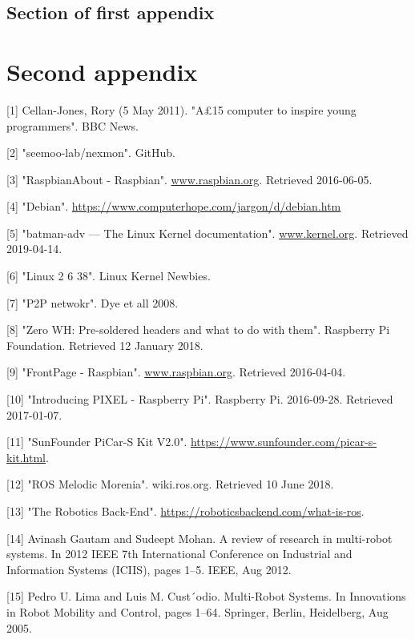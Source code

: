 \documentclass{mproj}
\begin{document}
\section{Section of first appendix}

\chapter{Second appendix}



[1] Cellan-Jones, Rory (5 May 2011). "A£15 computer to inspire young programmers". BBC News.

[2]  "seemoo-lab/nexmon". GitHub.

[3] "RaspbianAbout - Raspbian". \url{www.raspbian.org}. Retrieved 2016-06-05.

[4] "Debian". \url{https://www.computerhope.com/jargon/d/debian.htm}

[5] "batman-adv — The Linux Kernel documentation". \url{www.kernel.org}. Retrieved 2019-04-14.

[6] "Linux 2 6 38". Linux Kernel Newbies.

[7] "P2P netwokr". Dye et all 2008.

[8] "Zero WH: Pre-soldered headers and what to do with them". Raspberry Pi Foundation. Retrieved 12 January 2018.

[9] "FrontPage - Raspbian". \url{www.raspbian.org}. Retrieved 2016-04-04.

[10] "Introducing PIXEL - Raspberry Pi". Raspberry Pi. 2016-09-28. Retrieved 2017-01-07.

[11] "SunFounder PiCar-S Kit V2.0". \url{https://www.sunfounder.com/picar-s-kit.html}.

[12] "ROS Melodic Morenia". wiki.ros.org. Retrieved 10 June 2018.

[13] "The Robotics Back-End". \url{https://roboticsbackend.com/what-is-ros}.

[14] Avinash Gautam and Sudeept Mohan. A review of research in multi-robot systems. In 2012 IEEE 7th International Conference on Industrial and Information Systems (ICIIS), pages 1–5. IEEE, Aug 2012.

[15] Pedro U. Lima and Luis M. Cust´odio. Multi-Robot Systems. In Innovations in Robot Mobility and Control, pages 1–64. Springer, Berlin, Heidelberg, Aug 2005.
\end{document}
